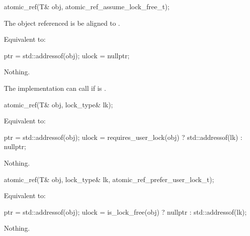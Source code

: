 \begin{addedblock}
\begin{itemdecl}
atomic_ref(T& obj, atomic_ref_assume_lock_free_t);
\end{itemdecl}

\begin{itemdescr}
\pnum
\expects The object referenced  is be aligned to .

\pnum
\effects Equivalent to:
\begin{codeblock}
  ptr = std::addressof(obj);
  ulock = nullptr;
\end{codeblock}

\pnum
\throws Nothing.

\pnum
\remarks The implementation can call  if  is .

\end{itemdescr}
\end{addedblock}


\begin{addedblock}
\begin{itemdecl}
atomic_ref(T& obj, lock_type& lk);
\end{itemdecl}

\begin{itemdescr}

\pnum
\effects Equivalent to:
\begin{codeblock}
  ptr = std::addressof(obj);
  ulock = requires_user_lock(obj) ? std::addressof(lk) : nullptr;
\end{codeblock}

\pnum
\throws Nothing.

\end{itemdescr}
\end{addedblock}


\begin{addedblock}
\begin{itemdecl}
atomic_ref(T& obj, lock_type& lk, atomic_ref_prefer_user_lock_t);
\end{itemdecl}

\begin{itemdescr}

\pnum
\effects Equivalent to:
\begin{codeblock}
  ptr = std::addressof(obj);
  ulock = is_lock_free(obj) ? nullptr : std::addressof(lk);
\end{codeblock}

\pnum
\throws Nothing.
\end{itemdescr}

\end{addedblock}



